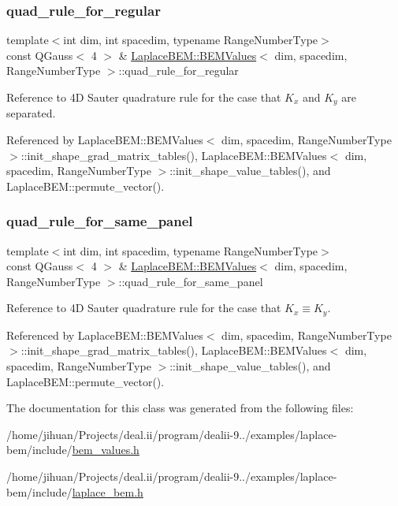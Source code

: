 \subsubsection{\texorpdfstring{quad\+\_\+rule\+\_\+for\+\_\+regular}{quad\_rule\_for\_regular}}
{\footnotesize\ttfamily template$<$int dim, int spacedim, typename Range\+Number\+Type$>$ \\
const Q\+Gauss$<$ 4 $>$ \& \hyperlink{classLaplaceBEM_1_1BEMValues}{Laplace\+B\+E\+M\+::\+B\+E\+M\+Values}$<$ dim, spacedim, Range\+Number\+Type $>$\+::quad\+\_\+rule\+\_\+for\+\_\+regular}

Reference to 4D Sauter quadrature rule for the case that $K_x$ and $K_y$ are separated. 

Referenced by Laplace\+B\+E\+M\+::\+B\+E\+M\+Values$<$ dim, spacedim, Range\+Number\+Type $>$\+::init\+\_\+shape\+\_\+grad\+\_\+matrix\+\_\+tables(), Laplace\+B\+E\+M\+::\+B\+E\+M\+Values$<$ dim, spacedim, Range\+Number\+Type $>$\+::init\+\_\+shape\+\_\+value\+\_\+tables(), and Laplace\+B\+E\+M\+::permute\+\_\+vector().

\mbox{\label{classLaplaceBEM_1_1BEMValues_aabf571f3c530ff65274122e468c3c987}} 
\subsubsection{\texorpdfstring{quad\+\_\+rule\+\_\+for\+\_\+same\+\_\+panel}{quad\_rule\_for\_same\_panel}}
{\footnotesize\ttfamily template$<$int dim, int spacedim, typename Range\+Number\+Type$>$ \\
const Q\+Gauss$<$ 4 $>$ \& \hyperlink{classLaplaceBEM_1_1BEMValues}{Laplace\+B\+E\+M\+::\+B\+E\+M\+Values}$<$ dim, spacedim, Range\+Number\+Type $>$\+::quad\+\_\+rule\+\_\+for\+\_\+same\+\_\+panel}

Reference to 4D Sauter quadrature rule for the case that $K_x \equiv K_y$. 

Referenced by Laplace\+B\+E\+M\+::\+B\+E\+M\+Values$<$ dim, spacedim, Range\+Number\+Type $>$\+::init\+\_\+shape\+\_\+grad\+\_\+matrix\+\_\+tables(), Laplace\+B\+E\+M\+::\+B\+E\+M\+Values$<$ dim, spacedim, Range\+Number\+Type $>$\+::init\+\_\+shape\+\_\+value\+\_\+tables(), and Laplace\+B\+E\+M\+::permute\+\_\+vector().



The documentation for this class was generated from the following files\+:\begin{DoxyCompactItemize}
\item 
/home/jihuan/\+Projects/deal.\+ii/program/dealii-\/9../examples/laplace-\/bem/include/\hyperlink{bem__values_8h}{bem\+\_\+values.\+h}\item 
/home/jihuan/\+Projects/deal.\+ii/program/dealii-\/9../examples/laplace-\/bem/include/\hyperlink{laplace__bem_8h}{laplace\+\_\+bem.\+h}\end{DoxyCompactItemize}
